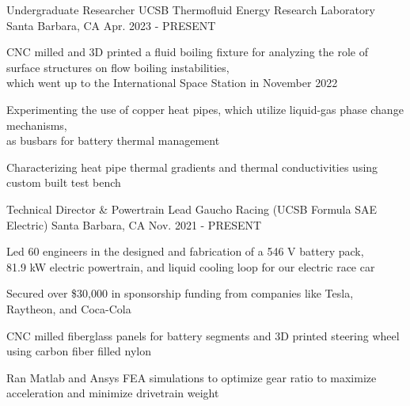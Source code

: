 

\begin{cventries}

\cventry
{Undergraduate Researcher} %
{UCSB Thermofluid Energy Research Laboratory} %
{Santa Barbara, CA} %
{Apr. 2023 - PRESENT} %
{ %
\begin{cvitems}   
\item {CNC milled and 3D printed a fluid boiling fixture for analyzing the role of surface structures on flow boiling instabilities,\\ which went up to the International Space Station in November 2022}
\item {Experimenting the use of copper heat pipes, which utilize liquid-gas phase change mechanisms,\\ as busbars for battery thermal management}
\item {Characterizing heat pipe thermal gradients and thermal conductivities using custom built test bench}
\end{cvitems}
}

\cventry
{Technical Director \& Powertrain Lead} %
{Gaucho Racing (UCSB Formula SAE Electric)} %
{Santa Barbara, CA} %
{Nov. 2021 - PRESENT} %
{ %
\begin{cvitems}   
\item {Led 60 engineers in the designed and fabrication of a 546 V battery pack, \\ 81.9 kW electric powertrain, and liquid cooling loop for our electric race car}
\item {Secured over \$30,000 in sponsorship funding from companies like Tesla, Raytheon, and Coca-Cola}
\item {CNC milled fiberglass panels for battery segments and 3D printed steering wheel using carbon fiber filled nylon}
\item {Ran Matlab and Ansys FEA simulations to optimize gear ratio to maximize acceleration and minimize drivetrain weight}
\end{cvitems}
}


\end{cventries}
